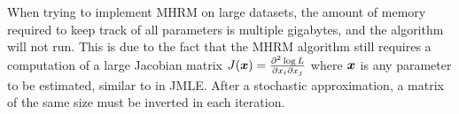 When trying to implement MHRM on large datasets, the amount of memory required to keep track of all parameters is multiple gigabytes, and the algorithm will not run. This is due to the fact that the MHRM algorithm still requires a computation of a large Jacobian matrix $J(\boldsymbol{x}) = \frac{\partial^2 \log L}{\partial x_i \partial x_j}$ where $\boldsymbol{x}$ is any parameter to be estimated, similar to in JMLE. After a stochastic approximation, a matrix of the same size must be inverted in each iteration. 


%
%
